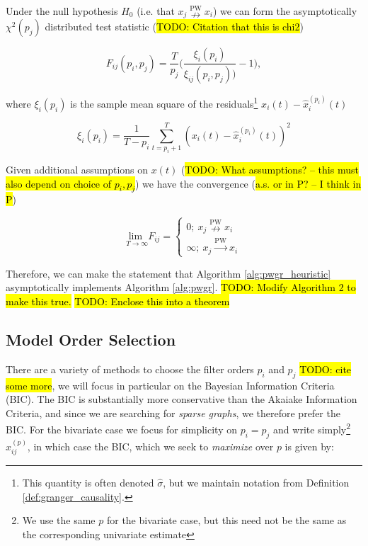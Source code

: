 \documentclass[12pt]{article}
\def\pwgc{\overset{\text{PW}}{\rightarrow}}  %
\def\npwgc{\overset{\text{PW}}{\nrightarrow}}  %
\begin{document}
Under the null hypothesis $H_0$ (i.e. that $x_j \npwgc x_i$) we can
form the asymptotically $\chi^2(p_j)$ distributed test statistic
(\hl{TODO: Citation that this is chi2})

\begin{equation}
  \label{eqn:gc_statistics}
  F_{ij}(p_i, p_j) = \frac{T}{p_j}\Big(\frac{\xi_i(p_i)}{\xi_{ij}(p_i, p_j))} - 1\Big),
\end{equation}

where $\xi_i(p_i)$ is the sample mean square of the residuals\footnote{This
  quantity is often denoted $\widehat{\sigma}$, but we maintain
  notation from Definition \ref{def:granger_causality}.}
$x_i(t) - \widehat{x}^{(p_i)}_i(t)$

\begin{equation*}
  \xi_i(p_i) = \frac{1}{T - p_i}\sum_{t = p_i + 1}^T (x_i(t) - \widehat{x}_i^{(p_i)}(t))^2
\end{equation*}

Given additional assumptions on $x(t)$ (\hl{TODO: What assumptions? --
  this must also depend on choice of $p_i, p_j$}) we have the
convergence (\hl{a.s. or in P?  -- I think in P})

\begin{equation}
  \underset{T \rightarrow \infty}{\text{lim }}F_{ij} =
  \left\{
    \begin{array}{ll}
      0;\ x_j \npwgc x_i\\
      \infty;\ x_j \pwgc x_i
    \end{array}
  \right.
\end{equation}

Therefore, we can make the statement that Algorithm
\ref{alg:pwgr_heuristic} asymptotically implements Algorithm
\ref{alg:pwgr}.  \hl{TODO: Modify Algorithm 2 to make this true.}
\hl{TODO: Enclose this into a theorem}

\subsection{Model Order Selection}
\label{sec:model_order_selection}
There are a variety of methods to choose the filter orders $p_i$ and
$p_j$ \hl{TODO: cite some more}, we will focus in particular on the
Bayesian Information Criteria (BIC).  The BIC is substantially more
conservative than the Akaiake Information Criteria, and since we are
searching for \textit{sparse graphs}, we therefore prefer the BIC. For
the bivariate case we focus for simplicity on $p_i = p_j$ and write
simply\footnote{We use the same $p$ for the bivariate case, but this
  need not be the same as the corresponding univariate estimate}
$x_{ij}^{(p)}$, in which case the BIC, which we seek to
\textit{maximize} over $p$ is given by:
\end{document}
